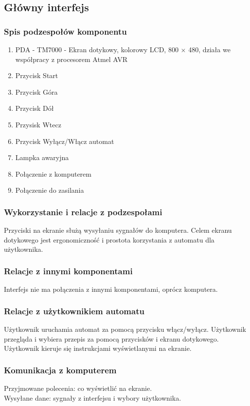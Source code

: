 \documentclass[12pt,a4paper,notitlepage]{article}
\begin{document}
\subsection{Główny interfejs}
\subsubsection{Spis podzespołów komponentu}
\begin{enumerate}
  \item PDA - TM7000 - Ekran dotykowy, kolorowy LCD, 800 $\times$ 480, działa we współpracy z procesorem Atmel AVR
  \item Przycisk Start
  \item Przycisk Góra
  \item Przycisk Dół
  \item Przysisk Wtecz
  \item Przycisk Wyłącz/Włącz automat
  \item Lampka awaryjna
  \item Połączenie z komputerem
  \item Połączenie do zasilania
\end{enumerate}

\subsubsection{Wykorzystanie i relacje z podzespołami}
Przyciski na ekranie służą wysyłaniu sygnałów do komputera. Celem ekranu dotykowego jest ergonomiczność i prostota korzystania z automatu dla użytkownika. 

\subsubsection{Relacje z innymi komponentami}
Interfejs nie ma połączenia z innymi komponentami, oprócz komputera.

\subsubsection{Relacje z użytkownikiem automatu}
Użytkownik uruchamia automat za pomocą przycisku włącz/wyłącz. Użytkownik przegląda i wybiera przepis za pomocą przycisków i ekranu dotykowego. Użytkownik kieruje się instrukcjami wyświetlanymi na ekranie.

\subsubsection{Komunikacja z komputerem}
Przyjmowane polecenia: co wyświetlić na ekranie.\\
Wysyłane dane: sygnały z interfejsu i wybory użytkownika.
\end{document}
